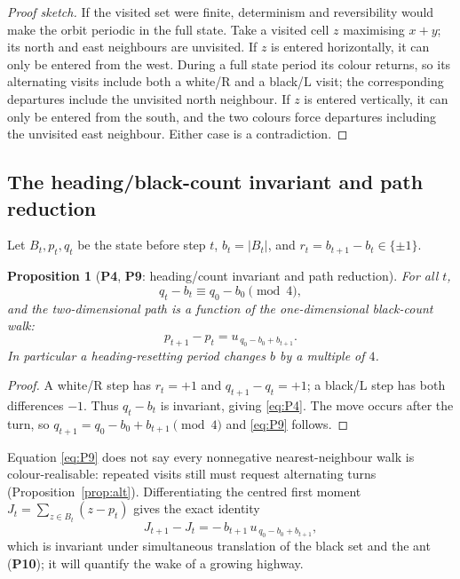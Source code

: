 \documentclass[11pt,reqno]{amsart}
\theoremstyle{plain}
\newtheorem{proposition}[theorem]{Proposition}
\theoremstyle{definition}
\newcommand{\turnR}{\mathrm{R}}
\newcommand{\turnL}{\mathrm{L}}
\newcommand{\PN}[1]{\textbf{P#1}}
\begin{document}
\begin{proof}[Proof sketch]
If the visited set were finite, determinism and reversibility would make the
orbit periodic in the full state. Take a visited cell $z$ maximising $x+y$; its
north and east neighbours are unvisited. If $z$ is entered horizontally, it can
only be entered from the west. During a full state period its colour returns, so
its alternating visits include both a white/$\turnR$ and a black/$\turnL$ visit;
the corresponding departures include the unvisited north neighbour. If $z$ is
entered vertically, it can only be entered from the south, and the two colours
force departures including the unvisited east neighbour. Either case is a
contradiction.
\end{proof}

\subsection{The heading/black-count invariant and path reduction}\label{sec:invariants}

Let $B_t,p_t,q_t$ be the state before step $t$, $b_t=|B_t|$, and
$r_t=b_{t+1}-b_t\in\{\pm1\}$.

\begin{proposition}[\PN{4}, \PN{9}: heading/count invariant and path reduction]
\label{prop:pathreduction}
For all $t$,
\begin{equation}\label{eq:P4}
q_t-b_t\equiv q_0-b_0\pmod 4,
\end{equation}
and the two-dimensional path is a function of the one-dimensional black-count
walk:
\begin{equation}\label{eq:P9}
p_{t+1}-p_t=u_{\,q_0-b_0+b_{t+1}}.
\end{equation}
In particular a heading-resetting period changes $b$ by a multiple of $4$.
\end{proposition}

\begin{proof}
A white/$\turnR$ step has $r_t=+1$ and $q_{t+1}-q_t=+1$; a black/$\turnL$ step
has both differences $-1$. Thus $q_t-b_t$ is invariant, giving \eqref{eq:P4}.
The move occurs after the turn, so $q_{t+1}=q_0-b_0+b_{t+1}\pmod4$ and
\eqref{eq:P9} follows.
\end{proof}

Equation \eqref{eq:P9} does not say every nonnegative nearest-neighbour walk is
colour-realisable: repeated visits still must request alternating turns
(Proposition~\ref{prop:alt}). Differentiating the centred first moment
$J_t=\sum_{z\in B_t}(z-p_t)$ gives the exact identity
\begin{equation}\label{eq:P10}
J_{t+1}-J_t=-\,b_{t+1}\,u_{\,q_0-b_0+b_{t+1}},
\end{equation}
which is invariant under simultaneous translation of the black set and the ant
(\PN{10}); it will quantify the wake of a growing highway.
\end{document}
